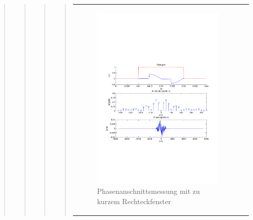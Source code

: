 \begin{quote}
\begin{quote}
\begin{quote}
\begin{quote}
\begin{center}
\begin{tabular}{ll}
\begin{minipage}{0.6\textwidth}
                         \begin{figure}[H]
                            \label{fig:}
                            \includegraphics[scale=0.4, trim = 1.5cm 7cm 1.5cm 8cm,
                            clip]{./Bilder/Phasenanschnittsmessungmitrechteckfensterleckeffekt} %
                            \caption{Phasenanschnittsmessung mit zu kurzem Rechteckfenster}
                        \end{figure}
                   \vspace{-1.5em}
    
                    \end{minipage}
    
                \end{tabular}
                \end{center}                
        

\end{quote}
\end{quote}
\end{quote}
\end{quote}
